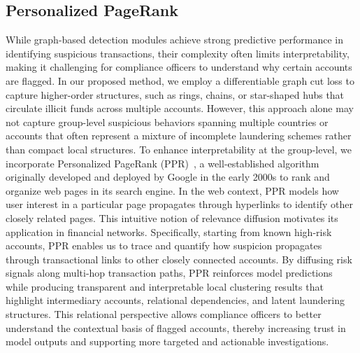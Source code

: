 \subsection{Personalized PageRank}
While graph-based detection modules achieve strong predictive performance in identifying suspicious transactions, their complexity often limits interpretability, making it challenging for compliance officers to understand why certain accounts are flagged. In our proposed method, we employ a differentiable graph cut loss to capture higher-order structures, such as rings, chains, or star-shaped hubs that circulate illicit funds across multiple accounts. However, this approach alone may not capture group-level suspicious behaviors spanning multiple countries or accounts that often represent a mixture of incomplete laundering schemes rather than compact local structures. To enhance interpretability at the group-level, we incorporate Personalized PageRank (PPR)~\parencite{page1999pagerank}, a well-established algorithm originally developed and deployed by Google in the early 2000s to rank and organize web pages in its search engine. In the web context, PPR models how user interest in a particular page propagates through hyperlinks to identify other closely related pages. This intuitive notion of relevance diffusion motivates its application in financial networks. Specifically, starting from known high-risk accounts, PPR enables us to trace and quantify how suspicion propagates through transactional links to other closely connected accounts. By diffusing risk signals along multi-hop transaction paths, PPR reinforces model predictions while producing transparent and interpretable local clustering results that highlight intermediary accounts, relational dependencies, and latent laundering structures. This relational perspective allows compliance officers to better understand the contextual basis of flagged accounts, thereby increasing trust in model outputs and supporting more targeted and actionable investigations.



